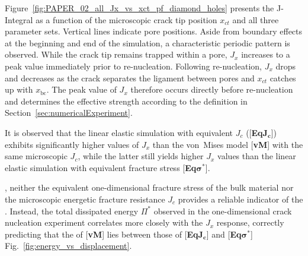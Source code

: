 \documentclass[pdflatex,sn-mathphys-num]{sn-jnl}%
\newcommand{\vMLabel}{[\textbf{vM}]\xspace}
\newcommand{\EqJcLabel}{[\textbf{Eq$\boldsymbol{J_c}$}]\xspace}
\newcommand{\EqSigmaStarLabel}{[\textbf{Eq$\boldsymbol{\sigma^*}$}]\xspace}
\theoremstyle{thmstyleone}%
\theoremstyle{thmstyletwo}%
\theoremstyle{thmstylethree}%
\begin{document}
Figure~\ref{fig:PAPER_02_all_Jx_vs_xct_pf_diamond_holes} presents the J-Integral as a function of the microscopic crack tip position $x_{ct}$  and all three parameter sets. Vertical lines indicate pore positions. Aside from boundary effects at the beginning and end of the simulation, a characteristic periodic pattern is observed. While the crack tip remains trapped within a pore, $J_x$ increases to a peak value immediately prior to re-nucleation. Following re-nucleation, $J_x$ drops and decreases as the crack separates the ligament between pores and $x_{ct}$ catches up with $x_{\text{bc}}$. The peak value of $J_x$ therefore occurs directly before re-nucleation and determines the effective strength according to the definition in Section~\ref{sec:numericalExperiment}.

It is observed that the linear elastic simulation with equivalent $J_c$ (\EqJcLabel) exhibits significantly higher values of $J_x$ than the von~Mises model \vMLabel with the same microscopic $J_c$, while the latter still yields higher $J_x$ values than the linear elastic simulation with equivalent fracture stress \EqSigmaStarLabel. 

, neither the equivalent one-dimensional fracture stress of the bulk material nor the microscopic energetic fracture resistance $J_c$ provides a reliable indicator of the . Instead, the total dissipated energy $\Pi^*$ observed in 
the one-dimensional crack nucleation experiment correlates more closely with the $J_x$ response, correctly predicting that the  of \vMLabel lies between those of \EqJcLabel and \EqSigmaStarLabel{} Fig.~\ref{fig:energy_vs_displacement}.
\end{document}

